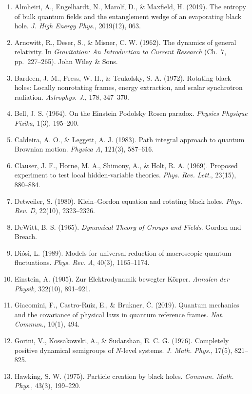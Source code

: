 \documentclass[11pt,a4paper]{article}
\begin{document}
\begin{enumerate}[label=\textbf{\arabic*.}, leftmargin=*, itemsep=0.3em]
    \item Almheiri, A., Engelhardt, N., Marolf, D., \& Maxfield, H. (2019). The entropy of bulk quantum fields and the entanglement wedge of an evaporating black hole. \emph{J. High Energy Phys.}, 2019(12), 063.
    \item Arnowitt, R., Deser, S., \& Misner, C. W. (1962). The dynamics of general relativity. In \emph{Gravitation: An Introduction to Current Research} (Ch.\ 7, pp.\ 227--265). John Wiley \& Sons.
    \item Bardeen, J. M., Press, W. H., \& Teukolsky, S. A. (1972). Rotating black holes: Locally nonrotating frames, energy extraction, and scalar synchrotron radiation. \emph{Astrophys. J.}, 178, 347--370.
    \item Bell, J. S. (1964). On the Einstein Podolsky Rosen paradox. \emph{Physics Physique Fizika}, 1(3), 195--200.
    \item Caldeira, A. O., \& Leggett, A. J. (1983). Path integral approach to quantum Brownian motion. \emph{Physica A}, 121(3), 587--616.
    \item Clauser, J. F., Horne, M. A., Shimony, A., \& Holt, R. A. (1969). Proposed experiment to test local hidden-variable theories. \emph{Phys. Rev. Lett.}, 23(15), 880--884.
    \item Detweiler, S. (1980). Klein--Gordon equation and rotating black holes. \emph{Phys. Rev. D}, 22(10), 2323--2326.
    \item DeWitt, B. S. (1965). \emph{Dynamical Theory of Groups and Fields}. Gordon and Breach.
    \item Diósi, L. (1989). Models for universal reduction of macroscopic quantum fluctuations. \emph{Phys. Rev. A}, 40(3), 1165--1174.
    \item Einstein, A. (1905). Zur Elektrodynamik bewegter Körper. \emph{Annalen der Physik}, 322(10), 891--921.
    \item Giacomini, F., Castro-Ruiz, E., \& Brukner, Č. (2019). Quantum mechanics and the covariance of physical laws in quantum reference frames. \emph{Nat. Commun.}, 10(1), 494.
    \item Gorini, V., Kossakowski, A., \& Sudarshan, E. C. G. (1976). Completely positive dynamical semigroups of $N$-level systems. \emph{J. Math. Phys.}, 17(5), 821--825.
    \item Hawking, S. W. (1975). Particle creation by black holes. \emph{Commun. Math. Phys.}, 43(3), 199--220.

\end{enumerate}
\end{document}
